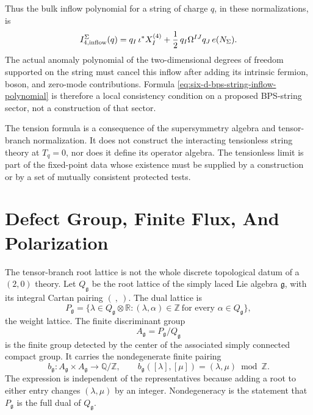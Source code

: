 Thus the bulk inflow polynomial for a string of charge \(q\), in these
normalizations, is
\begin{equation}
  I_{4,\rm inflow}^{\Sigma}(q)
  =
  q_I\,\iota^\ast X_I^{(4)}
  +
  \frac12\,q_I\Omega^{IJ}q_J\,e(N_\Sigma).
  \label{eq:six-d-bps-string-inflow-polynomial}
\end{equation}
The actual anomaly polynomial of the two-dimensional degrees of freedom
supported on the string must cancel this inflow after adding its intrinsic
fermion, boson, and zero-mode contributions.  Formula
\eqref{eq:six-d-bps-string-inflow-polynomial} is therefore a local
consistency condition on a proposed BPS-string sector, not a construction of
that sector.

\begin{remark}
The tension formula is a consequence of the supersymmetry algebra and
tensor-branch normalization.  It does not construct the interacting
tensionless string theory at \(T_q=0\), nor does it define its operator
algebra.  The tensionless limit is part of the fixed-point data whose
existence must be supplied by a construction or by a set of mutually
consistent protected tests.
\end{remark}

\section{Defect Group, Finite Flux, And Polarization}
\label{sec:six-d-defect-group-polarization}

The tensor-branch root lattice is not the whole discrete topological datum of
a \((2,0)\) theory.  Let \(Q_{\mathfrak g}\) be the root lattice of the simply
laced Lie algebra \(\mathfrak g\), with its integral Cartan pairing
\((\ ,\ )\).  The dual lattice is
\[
  P_{\mathfrak g}
  =
  \{\lambda\in Q_{\mathfrak g}\otimes\mathbb R:
  (\lambda,\alpha)\in\mathbb Z\ \text{for every }\alpha\in Q_{\mathfrak g}\},
\]
the weight lattice.  The finite discriminant group
\begin{equation}
  A_{\mathfrak g}=P_{\mathfrak g}/Q_{\mathfrak g}
  \label{eq:six-d-two-zero-defect-group}
\end{equation}
is the finite group detected by the center of the associated simply connected
compact group.  It carries the nondegenerate finite pairing
\begin{equation}
  b_{\mathfrak g}:A_{\mathfrak g}\times A_{\mathfrak g}
  \longrightarrow \mathbb Q/\mathbb Z,
  \qquad
  b_{\mathfrak g}([\lambda],[\mu])=(\lambda,\mu)\bmod\mathbb Z .
  \label{eq:six-d-defect-group-pairing}
\end{equation}
The expression is independent of the representatives because adding a root to
either entry changes \((\lambda,\mu)\) by an integer.  Nondegeneracy is the
statement that \(P_{\mathfrak g}\) is the full dual of \(Q_{\mathfrak g}\).

